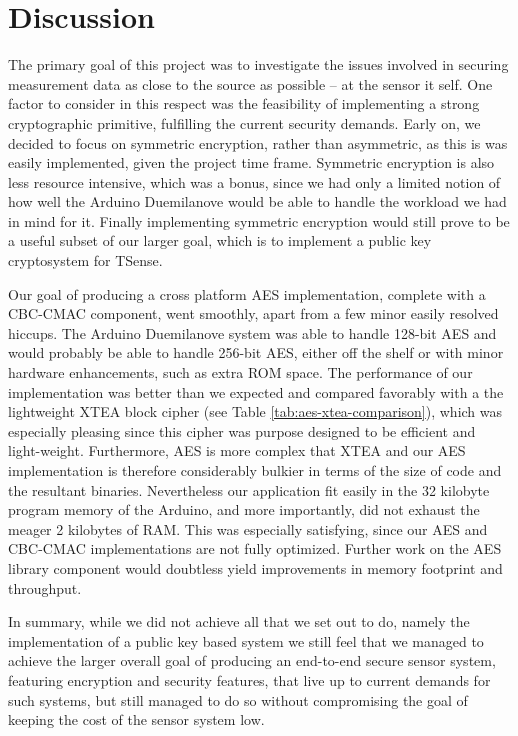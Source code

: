 
\chapter{Discussion}
\label{sec:discussion}

The primary goal of this project was to investigate the issues involved in securing measurement data as close to the source as possible -- at the sensor it self. One factor to consider in this respect was the feasibility of implementing a strong cryptographic primitive, fulfilling the current security demands. 
%
Early on, we decided to focus on symmetric encryption, rather than asymmetric, as this is was easily implemented, given the project time frame. Symmetric encryption is also less resource intensive, which was a bonus, since we had only a limited notion of how well the Arduino Duemilanove would be able to handle the workload we had in mind for it. Finally implementing symmetric encryption would still prove to be a useful subset of our larger goal, which is to implement a public key cryptosystem for TSense.

Our goal of producing a cross platform AES implementation, complete with a CBC-CMAC component, went smoothly, apart from a few minor easily resolved hiccups. The Arduino Duemilanove system was able to handle 128-bit AES and would probably be able to handle 256-bit AES, either off the shelf or with minor hardware enhancements, such as extra ROM space. 
%
The performance of our implementation was better than we expected and compared favorably with a the lightweight XTEA block cipher (see Table \ref{tab:aes-xtea-comparison}), which was especially pleasing since this cipher was purpose designed to be efficient and light-weight. Furthermore, AES is more complex that XTEA and our AES implementation is therefore considerably bulkier in terms of the size of code and the resultant binaries. Nevertheless our application fit easily in the 32 kilobyte program memory of the Arduino, and more importantly, did not exhaust the meager 2 kilobytes of RAM. This was especially satisfying, since our AES and CBC-CMAC implementations are not fully optimized. Further work on the AES library component would doubtless yield improvements in memory footprint and throughput. 

In summary, while we did not achieve all that we set out to do, namely the implementation of a public key based system we still feel that we managed to achieve the larger overall goal of producing an end-to-end secure sensor system, featuring encryption and security features, that live up to current demands for such systems, but still managed to do so without compromising the goal of keeping the cost of the sensor system low.

